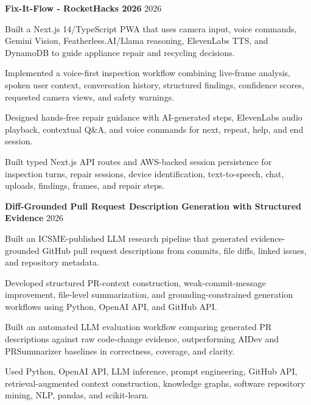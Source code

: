 \documentclass[letterpaper,10pt]{article}
\newcommand{\projectHeading}[2]{
  \vspace{2pt}
  \textbf{#1} \hfill #2
}
\begin{document}
\projectHeading{Fix-It-Flow - RocketHacks 2026}{2026}
\begin{tightitemize}
  \item Built a Next.js 14/TypeScript PWA that uses camera input, voice commands, Gemini Vision, Featherless.AI/Llama reasoning, ElevenLabs TTS, and DynamoDB to guide appliance repair and recycling decisions.
  \item Implemented a voice-first inspection workflow combining live-frame analysis, spoken user context, conversation history, structured findings, confidence scores, requested camera views, and safety warnings.
  \item Designed hands-free repair guidance with AI-generated steps, ElevenLabs audio playback, contextual Q\&A, and voice commands for next, repeat, help, and end session.
  \item Built typed Next.js API routes and AWS-backed session persistence for inspection turns, repair sessions, device identification, text-to-speech, chat, uploads, findings, frames, and repair steps.
\end{tightitemize}

\projectHeading{Diff-Grounded Pull Request Description Generation with Structured Evidence}{2026}
\begin{tightitemize}
  \item Built an ICSME-published LLM research pipeline that generated evidence-grounded GitHub pull request descriptions from commits, file diffs, linked issues, and repository metadata.
  \item Developed structured PR-context construction, weak-commit-message improvement, file-level summarization, and grounding-constrained generation workflows using Python, OpenAI API, and GitHub API.
  \item Built an automated LLM evaluation workflow comparing generated PR descriptions against raw code-change evidence, outperforming AIDev and PRSummarizer baselines in correctness, coverage, and clarity.
  \item Used Python, OpenAI API, LLM inference, prompt engineering, GitHub API, retrieval-augmented context construction, knowledge graphs, software repository mining, NLP, pandas, and scikit-learn.
\end{tightitemize}
\end{document}
